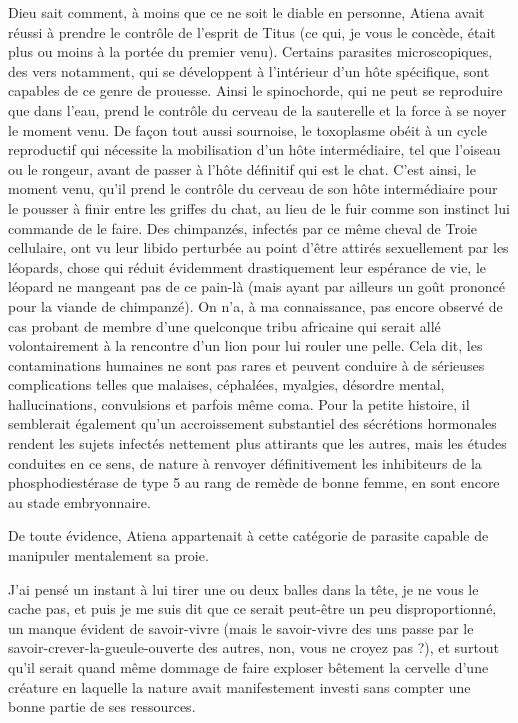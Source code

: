 Dieu sait comment, à moins que ce ne soit le diable en personne, \label{rat:32}Atiena avait réussi à prendre le contrôle de l’esprit de Titus (ce qui, je vous le concède, était plus ou moins à la portée du premier venu). Certains parasites microscopiques, des vers notamment, qui se développent à l’intérieur d’un hôte spécifique, sont capables de ce genre de prouesse. Ainsi le spinochorde, qui ne peut se reproduire que dans l’eau, prend le contrôle du cerveau de la sauterelle et la force à se noyer le moment venu. De façon tout aussi sournoise, le toxoplasme obéit à un cycle reproductif qui nécessite la mobilisation d’un hôte intermédiaire, tel que l’oiseau ou le rongeur, avant de passer à l’hôte définitif qui est le chat. C’est ainsi, le moment venu, qu’il prend le contrôle du cerveau de son hôte intermédiaire pour le pousser à finir entre les griffes du chat, au lieu de le fuir comme son instinct lui commande de le faire. Des chimpanzés, infectés par ce même cheval de Troie cellulaire, ont vu leur libido perturbée au point d’être attirés sexuellement par les léopards, chose qui réduit évidemment drastiquement leur espérance de vie, le léopard ne mangeant pas de ce pain-là (mais ayant par ailleurs un goût prononcé pour la viande de chimpanzé). On n’a, à ma connaissance, pas encore observé de cas probant de membre d’une quelconque tribu africaine qui serait allé volontairement à la rencontre d’un lion pour lui rouler une pelle. Cela dit, les contaminations humaines ne sont pas rares et peuvent conduire à de sérieuses complications telles que malaises, céphalées, myalgies, désordre mental, hallucinations, convulsions et parfois même coma. Pour la petite histoire, il semblerait également qu’un accroissement substantiel des sécrétions hormonales rendent les sujets infectés nettement plus attirants que les autres, mais les études conduites en ce sens, de nature à renvoyer définitivement les inhibiteurs de la phosphodiestérase de type 5 au rang de remède de bonne femme, en sont encore au stade embryonnaire.

De toute évidence, Atiena appartenait à cette catégorie de parasite capable de manipuler mentalement sa proie.

J’ai pensé un instant à lui tirer une ou deux balles dans la tête, je ne vous le cache pas, et puis je me suis dit que ce serait peut-être un peu disproportionné, un manque évident de savoir-vivre (mais le savoir-vivre des uns passe par le savoir-crever-la-gueule-ouverte des autres, non, vous ne croyez pas ?), et surtout qu’il serait quand même dommage de faire exploser bêtement la cervelle d’une créature en laquelle la nature avait manifestement investi sans compter une bonne partie de ses ressources.

